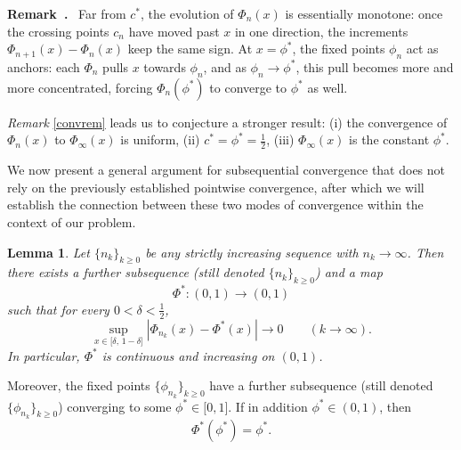\documentclass[onecolumn]{article}
\newtheorem{lemma}[theorem]{Lemma}
\newenvironment{remark}{  \refstepcounter{theorem}  \par\medskip\noindent\textbf{Remark~\thetheorem.}\rmfamily\ }{\par\medskip}
\begin{document}
\begin{remark}
\label{convrem}Far from $c^{\ast }$, the evolution of $\Phi _{n}(x)$ is
essentially monotone: once the crossing points $c_{n}$ have moved past $x$
in one direction, the increments $\Phi _{n+1}(x)-\Phi _{n}(x)$ keep the same
sign. At $x=\phi ^{\ast }$, the fixed points $\phi _{n}$ act as anchors:
each $\Phi _{n}$ pulls $x$ towards $\phi _{n}$, and as $\phi _{n}\rightarrow
\phi ^{\ast }$, this pull becomes more and more concentrated, forcing $\Phi
_{n}(\phi ^{\ast })$ to converge to $\phi ^{\ast }$ as well.
\end{remark}

\textit{Remark} \ref{convrem} leads us to conjecture a stronger result: (i)
the convergence of $\Phi _{n}(x)$ to $\Phi _{\infty }(x)$ is uniform, (ii) $%
c^{\ast }=\phi ^{\ast }=\frac{1}{2}$, (iii) $\Phi _{\infty }(x)$ is the
constant $\phi ^{\ast }$.

We now present a general argument for subsequential convergence that does
not rely on the previously established pointwise convergence, after which we
will establish the connection between these two modes of convergence within
the context of our problem.

\begin{lemma}
\label{Phi-AA-subseq} Let $\{n_{k}\}_{k\geq 0}$ be any strictly increasing
sequence with $n_{k}\rightarrow \infty $. Then there exists a further
subsequence (still denoted $\{n_{k}\}_{k\geq 0}$) and a map 
\begin{equation}
\Phi ^{\ast }:(0,1)\rightarrow (0,1)  \label{872}
\end{equation}%
such that for every $0<\delta <\tfrac{1}{2}$, 
\begin{equation}
\sup_{x\in \lbrack \delta ,\,1-\delta ]}\left\vert \Phi _{n_{k}}(x)-\Phi
^{\ast }(x)\right\vert \longrightarrow 0\qquad (k\rightarrow \infty ).
\label{873}
\end{equation}%
In particular, $\Phi ^{\ast }$ is continuous and increasing on $(0,1)$.
\end{lemma}

Moreover, the fixed points $\{\phi _{n_{k}}\}_{k\geq 0}$ have a further
subsequence (still denoted $\{\phi _{n_{k}}\}_{k\geq 0}$) converging to some 
$\phi ^{\ast }\in \lbrack 0,1]$. If in addition $\phi ^{\ast }\in (0,1)$,
then 
\begin{equation}
\Phi ^{\ast }(\phi ^{\ast })=\phi ^{\ast }.  \label{874}
\end{equation}
\end{document}
